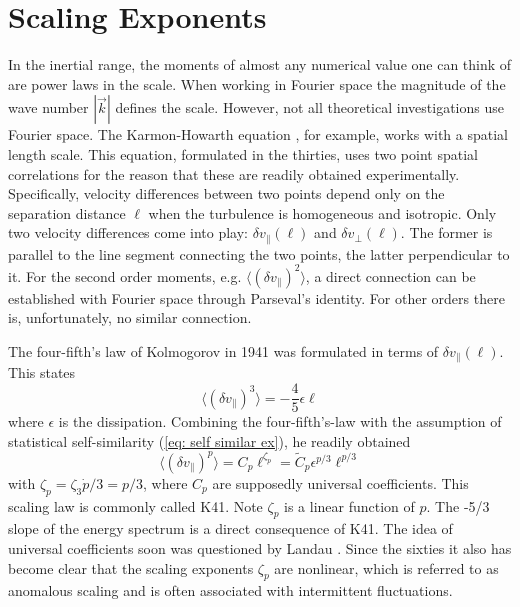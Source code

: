\section{Scaling Exponents}

In the inertial range, the moments of almost any numerical value one can think of are power laws in the scale.  When working in Fourier space the magnitude of the wave number $|\vec{k}|$ defines the scale.  However, not all theoretical investigations use Fourier space.  The Karmon-Howarth equation \cite{Hinze}, for example, works with a spatial length scale.  This equation, formulated in the thirties, uses two point spatial correlations for the reason that these are readily obtained experimentally.  Specifically, velocity differences between two points depend only on the separation distance $\ell$ when the turbulence is homogeneous and isotropic.  Only two velocity differences come into play: $\delta v_{\parallel}(\ell)$ and $\delta v_{\perp}(\ell)$.  The former is parallel to the line segment connecting the two points, the latter perpendicular to it.  For the second order moments, e.g. $\langle (\delta v_{\parallel})^2\rangle$, a direct connection can be established with Fourier space through Parseval's identity.  For other orders there is, unfortunately, no similar connection.

The four-fifth's law of Kolmogorov in 1941 was formulated in terms of $\delta v_{\parallel}(\ell)$.  This states
\begin{equation}
    \langle (\delta v_{\parallel})^3\rangle = -\frac{4}{5} \epsilon \ell
\end{equation}
where $\epsilon$ is the dissipation. Combining the four-fifth's-law with the assumption of statistical self-similarity (\ref{eq: self similar ex}), he readily obtained
\begin{equation}
    \langle (\delta v_{\parallel})^p\rangle = C_p\ell^{\zeta_p} = \tilde{C}_p\epsilon^{p/3}\ell^{p/3}
\end{equation}
with $\zeta_p = \zeta_3\dot p/3 = p/3$, where $C_p$ are supposedly universal coefficients.  This scaling law is commonly called K41.  Note $\zeta_p$ is a linear function of $p$.  The -5/3 slope of the energy spectrum is a direct consequence of K41.  The idea of universal coefficients soon was questioned by Landau \cite{Frisch}.  Since the sixties it also has become clear that the scaling exponents $\zeta_p$ are nonlinear, which is referred to as anomalous scaling and is often associated with intermittent fluctuations.

